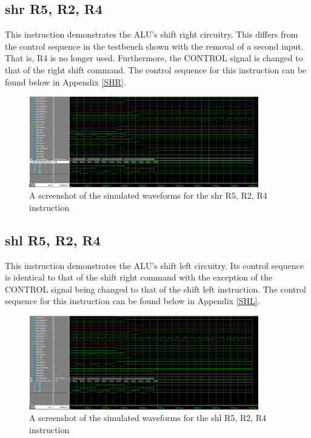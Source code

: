 \documentclass{article}
\begin{document}
    \subsection{shr R5, R2, R4}
    This instruction demonstrates the ALU's shift right circuitry. This differs from the control sequence in the testbench shown with the removal of a second input. That is, R4 is no longer used. Furthermore, the CONTROL signal is changed to that of the right shift command. The control sequence for this instruction can be found below in Appendix \ref{SHR}.
    
    \begin{figure}[h!]
        \begin{center}
            \includegraphics[width=10cm]{shr}
            \caption{A screenshot of the simulated waveforms for the shr R5, R2, R4 instruction}
        \end{center}
    \end{figure}

    \subsection{shl R5, R2, R4}
    This instruction demonstrates the ALU's shift left circuitry. Its control sequence is identical to that of the shift right command with the exception of the CONTROL signal being changed to that of the shift left instruction. The control sequence for this instruction can be found below in Appendix \ref{SHL}.

    \begin{figure}[h!]
        \begin{center}
            \includegraphics[width=10cm]{shl}
            \caption{A screenshot of the simulated waveforms for the shl R5, R2, R4 instruction}
        \end{center}
    \end{figure}
\end{document}
